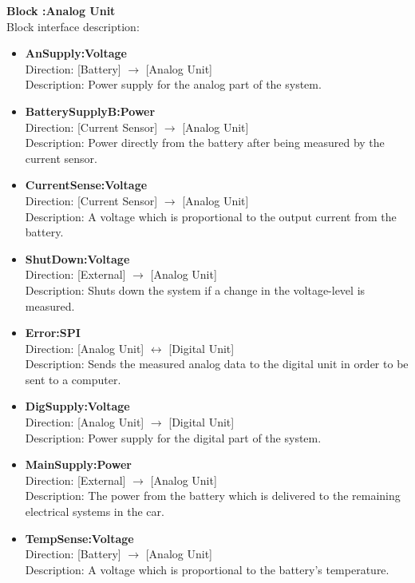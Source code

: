\textbf{Block :Analog Unit}\\
Block interface description:
\begin{itemize}
	\item \textbf{AnSupply:Voltage}\\
	Direction: [Battery] $\rightarrow$ [Analog Unit]\\
	Description: Power supply for the analog part of the system.
	\item \textbf{BatterySupplyB:Power}\\
	Direction: [Current Sensor] $\rightarrow$ [Analog Unit]\\
	Description: Power directly from the battery after being measured by the current sensor.
	\item \textbf{CurrentSense:Voltage}\\
	Direction: [Current Sensor] $\rightarrow$ [Analog Unit]\\
	Description: A voltage which is proportional to the output current from the battery.
	\item \textbf{ShutDown:Voltage}\\
	Direction: [External] $\rightarrow$ [Analog Unit]\\
	Description: Shuts down the system if a change in the voltage-level is measured.
	\item \textbf{Error:SPI}\\
	Direction: [Analog Unit] $\leftrightarrow$ [Digital Unit]\\
	Description: Sends the measured analog data to the digital unit in order to be sent to a computer.
	\item \textbf{DigSupply:Voltage}\\
	Direction: [Analog Unit] $\rightarrow$ [Digital Unit]\\
	Description: Power supply for the digital part of the system.
	\item \textbf{MainSupply:Power}\\
	Direction: [External] $\rightarrow$ [Analog Unit]\\
	Description: The power from the battery which is delivered to the remaining electrical systems in the car.
	\item \textbf{TempSense:Voltage}\\
	Direction: [Battery] $\rightarrow$ [Analog Unit]\\
	Description: A voltage which is proportional to the battery's temperature.
\end{itemize}

